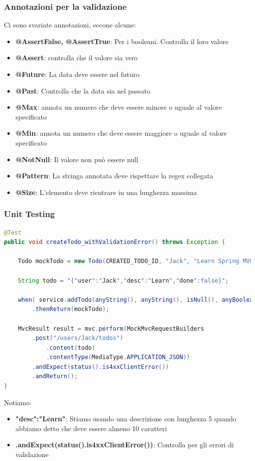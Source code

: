\documentclass[11pt,a4paper]{book}
\begin{document}
\subsubsection{Annotazioni per la validazione}
Ci sono svariate annotazioni, eccone alcune:
\begin{itemize}
	\item \textbf{@AssertFalse, @AssertTrue}: Per i booleani. Controlla il loro valore
	\item \textbf{@Assert}: controlla che il valore sia vero
	\item \textbf{@Future}: La data deve essere nel futuro
	\item \textbf{@Past}: Controlla che la data sia nel passato
	\item \textbf{@Max}: annota un numero che deve essere minore o uguale al valore specificato
	\item \textbf{@Min}: annota un numero che deve essere maggiore o uguale al valore specificato
	\item \textbf{@NotNull}: Il valore non può essere null
	\item \textbf{@Pattern}: La stringa annotata deve rispettare la regex collegata
	\item \textbf{@Size}: L'elemento deve rientrare in una lunghezza massima
\end{itemize}

\subsubsection{Unit Testing}
\begin{lstlisting}[language = Java]
@Test
public void createTodo_withValidationError() throws Exception {
	
	Todo mockTodo = new Todo(CREATED_TODO_ID, "Jack", "Learn Spring MVC", new Date(), false);

	String todo = "{"user":"Jack","desc":"Learn","done":false}";

	when( service.addTodo(anyString(), anyString(), isNull(), anyBoolean()))
		.thenReturn(mockTodo);
	
	MvcResult result = mvc.perform(MockMvcRequestBuilders
		.post("/users/Jack/todos")
			.content(todo)
			.contentType(MediaType.APPLICATION_JSON))
		.andExpect(status().is4xxClientError())
		.andReturn();
}
\end{lstlisting}
Notiamo:
\begin{itemize}
	\item \textbf{"desc":"Learn"}: Stiamo usando una descrizione con lunghezza 5 quando abbiamo detto che deve essere almeno 10 caratteri
	\item \textbf{.andExpect(status().is4xxClientError())}: Controlla per gli errori di validazione
\end{itemize}
\end{document}
